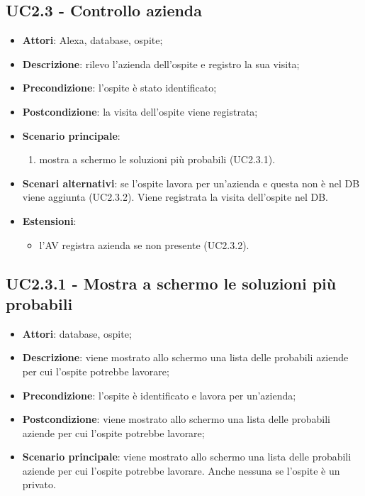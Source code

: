 \documentclass[../AnalisiDeiRequisiti.tex]{subfiles}
\begin{document}
\subsection{UC2.3 - Controllo azienda} 
\label{sssec:UC2.3} 
\begin{itemize} 
\item \textbf{Attori}: Alexa, database, ospite;
\item \textbf{Descrizione}: rilevo l'azienda dell'ospite e registro la sua visita;
\item \textbf{Precondizione}: l'ospite è stato identificato;
\item \textbf{Postcondizione}: la visita dell'ospite viene registrata;
\item \textbf{Scenario principale}: \begin{enumerate}\item mostra a schermo le soluzioni più probabili (UC2.3.1). 
 \end{enumerate}
\item \textbf{Scenari alternativi}: se l'ospite lavora per un'azienda e questa non è nel DB viene aggiunta (UC2.3.2).
Viene registrata la visita dell'ospite nel DB.
\item \textbf{Estensioni}:\begin{itemize}\item l'AV registra azienda se non presente (UC2.3.2).\end{itemize}
\end{itemize} 
\subsection{UC2.3.1 - Mostra a schermo le soluzioni più probabili} 
\label{sssec:UC2.3.1} 
\begin{itemize} 
\item \textbf{Attori}: database, ospite;
\item \textbf{Descrizione}: viene mostrato allo schermo una lista delle probabili aziende per cui l'ospite potrebbe lavorare;
\item \textbf{Precondizione}: l'ospite è identificato e lavora per un'azienda;
\item \textbf{Postcondizione}: viene mostrato allo schermo una lista delle probabili aziende per cui l'ospite potrebbe lavorare;
\item \textbf{Scenario principale}: viene mostrato allo schermo una lista delle probabili aziende per cui l'ospite potrebbe lavorare. Anche nessuna se l'ospite è un privato.\end{itemize} 
\end{document}
